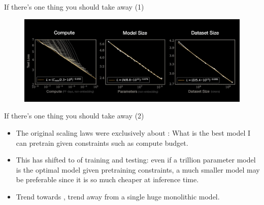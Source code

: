 \begin{vbframe}{If there's one thing you should take away (1)}

\vfill

\begin{figure}
	\centering
	\includegraphics[width = 12cm]{./figure/3thingserrorratescaleswith.png} \\ 
\end{figure}

\vfill

\end{vbframe}

\begin{vbframe}{If there's one thing you should take away (2)}


\vfill

\begin{itemize}
	\item The original scaling laws were exclusively
        about : What is the best model
        I can pretrain given
        constraints such as compute budget.

\item This has shifted to  of training
        and testing: even if a trillion parameter model is the optimal
        model given pretraining constraints, a much smaller
        model may be preferable since it is so much cheaper at
        inference time.

\item Trend towards , trend away
        from a single huge monolithic model.

\end{itemize}

\vfill

\end{vbframe}



\endlecture

